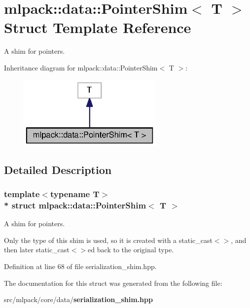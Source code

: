 \section{mlpack\+:\+:data\+:\+:Pointer\+Shim$<$ T $>$ Struct Template Reference}
\label{structmlpack_1_1data_1_1PointerShim}


A shim for pointers.  




Inheritance diagram for mlpack\+:\+:data\+:\+:Pointer\+Shim$<$ T $>$\+:
\nopagebreak
\begin{figure}[H]
\begin{center}
\leavevmode
\includegraphics[width=200pt]{structmlpack_1_1data_1_1PointerShim__inherit__graph}
\end{center}
\end{figure}


\subsection{Detailed Description}
\subsubsection*{template$<$typename T$>$\\*
struct mlpack\+::data\+::\+Pointer\+Shim$<$ T $>$}

A shim for pointers. 

Only the type of this shim is used, so it is created with a static\+\_\+cast$<$$>$, and then later static\+\_\+cast$<$$>$ed back to the original type. 

Definition at line 68 of file serialization\+\_\+shim.\+hpp.



The documentation for this struct was generated from the following file\+:\begin{DoxyCompactItemize}
\item 
src/mlpack/core/data/{\bf serialization\+\_\+shim.\+hpp}\end{DoxyCompactItemize}
